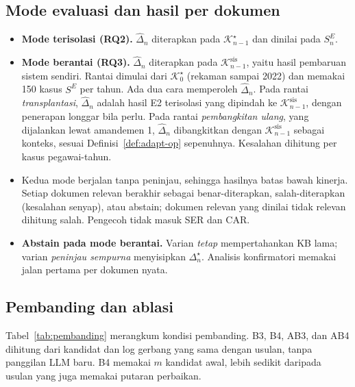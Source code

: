 \documentclass[journal,a4paper]{IEEEtran}
\makeatletter
\DeclareRobustCommand{\en}[1]{{\usefont{\f@encoding}{\f@family}{\f@series}{it}#1\/}}
\newcommand{\K}{\mathcal{K}}
\newcommand{\emas}{\star}
\newcommand{\SE}{S^{E}}
\makeatother
\begin{document}
\subsection{Mode evaluasi dan hasil per dokumen}
\begin{itemize}[leftmargin=*,nosep]
  \item \textbf{Mode terisolasi (RQ2).} $\hat{\Delta}_n$ diterapkan pada $\K^{\emas}_{n-1}$ dan dinilai pada $\SE_n$.
  \item \textbf{Mode berantai (RQ3).} $\hat{\Delta}_n$ diterapkan pada $\K^{\mathrm{sis}}_{n-1}$, yaitu hasil pembaruan sistem sendiri. Rantai dimulai dari $\K^{\emas}_0$ (rekaman sampai 2022) dan memakai 150 kasus $\SE$ per tahun. Ada dua cara memperoleh $\hat{\Delta}_n$. Pada rantai \emph{transplantasi}, $\hat{\Delta}_n$ adalah hasil E2 terisolasi yang dipindah ke $\K^{\mathrm{sis}}_{n-1}$, dengan penerapan longgar bila perlu. Pada rantai \emph{pembangkitan ulang}, yang dijalankan lewat amandemen 1, $\hat{\Delta}_n$ dibangkitkan dengan $\K^{\mathrm{sis}}_{n-1}$ sebagai konteks, sesuai Definisi~\ref{def:adapt-op} sepenuhnya. Kesalahan dihitung per kasus pegawai-tahun.
  \item Kedua mode berjalan tanpa peninjau, sehingga hasilnya batas bawah kinerja. Setiap dokumen relevan berakhir sebagai benar-diterapkan, salah-diterapkan (kesalahan senyap), atau \en{abstain}; dokumen relevan yang dinilai tidak relevan dihitung salah. Pengecoh tidak masuk SER dan CAR.
  \item \textbf{\en{Abstain} pada mode berantai.} Varian \emph{tetap} mempertahankan KB lama; varian \emph{peninjau sempurna} menyisipkan $\Delta^{\emas}_n$. Analisis konfirmatori memakai jalan pertama per dokumen nyata.
\end{itemize}

\subsection{Pembanding dan ablasi}
Tabel~\ref{tab:pembanding} merangkum kondisi pembanding. B3, B4, AB3, dan AB4 dihitung dari kandidat dan log gerbang yang sama dengan usulan, tanpa panggilan LLM baru. B4 memakai $m$ kandidat awal, lebih sedikit daripada usulan yang juga memakai putaran perbaikan.
\end{document}
